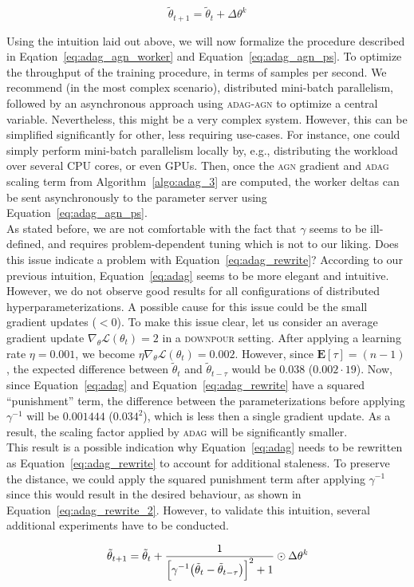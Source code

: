 \begin{equation}
  \label{eq:adag_agn_ps}
  \tilde{\theta}_{t+1} = \tilde{\theta}_t + \Delta\theta^k
\end{equation}

Using the intuition laid out above, we will now formalize the procedure described in Eqation~\ref{eq:adag_agn_worker} and Equation~\ref{eq:adag_agn_ps}. To optimize the throughput of the training procedure, in terms of samples per second. We recommend (in the most complex scenario), distributed mini-batch parallelism, followed by an asynchronous approach using \textsc{adag-agn} to optimize a central variable. Nevertheless, this might be a very complex system. However, this can be simplified significantly for other, less requiring use-cases. For instance, one could simply perform mini-batch parallelism locally by, e.g., distributing the workload over several CPU cores, or even GPUs. Then, once the \textsc{agn} gradient and \textsc{adag} scaling term from Algorithm~\ref{algo:adag_3} are computed, the worker deltas can be sent asynchronously to the parameter server using Equation~\ref{eq:adag_agn_ps}.\\

As stated before, we are not comfortable with the fact that $\gamma$ seems to be ill-defined, and requires problem-dependent tuning which is not to our liking. Does this issue indicate a problem with Equation~\ref{eq:adag_rewrite}? According to our previous intuition, Equation~\ref{eq:adag} seems to be more elegant and intuitive. However, we do not observe good results for all configurations of distributed hyperparameterizations. A possible cause for this issue could be the small gradient updates ($< 0$). To make this issue clear, let us consider an average gradient update $\nabla_\theta \mathcal{L}(\theta_t) = 2$ in a \textsc{downpour} setting. After applying a learning rate $\eta = 0.001$, we become $\eta\nabla_\theta \mathcal{L}(\theta_t) = 0.002$. However, since $\mathbf{E}[\tau] = (n - 1)$, the expected difference between $\tilde{\theta}_t$ and $\tilde{\theta}_{t-\tau}$ would be $0.038$ ($0.002 \cdot 19$). Now, since Equation~\ref{eq:adag} and Equation~\ref{eq:adag_rewrite} have a squared ``punishment'' term, the difference between the parameterizations before applying $\gamma^{-1}$ will be $0.001444$ ($0.034^2$), which is less then a single gradient update. As a result, the scaling factor applied by \textsc{adag} will be significantly smaller.\\

This result is a possible indication why Equation~\ref{eq:adag} needs to be rewritten as Equation~\ref{eq:adag_rewrite} to account for additional staleness. To preserve the distance, we could apply the squared punishment term after applying $\gamma^{-1}$ since this would result in the desired behaviour, as shown in Equation~\ref{eq:adag_rewrite_2}. However, to validate this intuition, several additional experiments have to be conducted.

\begin{equation}
  \label{eq:adag_rewrite_2}
  \tilde{\theta}_{t + 1} = \tilde{\theta}_t + \frac{\displaystyle 1}{\displaystyle \Big[\gamma^{-1}\big(\tilde{\theta}_t - \tilde{\theta}_{t - \tau}\big) \Big]^2 + 1} \odot \Delta\theta^k
\end{equation}

